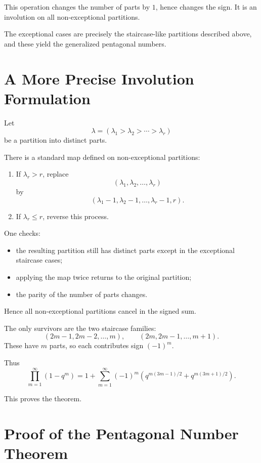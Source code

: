 \documentclass[11pt]{article}
\theoremstyle{definition}
\theoremstyle{remark}
\begin{document}
	This operation changes the number of parts by \(1\), hence changes the sign. It is an involution on all non-exceptional partitions.
	
	The exceptional cases are precisely the staircase-like partitions described above, and these yield the generalized pentagonal numbers.
	
	\section{A More Precise Involution Formulation}
	
	Let
	\[
	\lambda=(\lambda_1>\lambda_2>\cdots>\lambda_r)
	\]
	be a partition into distinct parts.
	
	There is a standard map defined on non-exceptional partitions:
	\begin{enumerate}[label=\arabic*.]
		\item If \(\lambda_r>r\), replace
		\[
		(\lambda_1,\lambda_2,\dots,\lambda_r)
		\]
		by
		\[
		(\lambda_1-1,\lambda_2-1,\dots,\lambda_r-1,r).
		\]
		\item If \(\lambda_r\le r\), reverse this process.
	\end{enumerate}
	
	One checks:
	\begin{itemize}
		\item the resulting partition still has distinct parts except in the exceptional staircase cases;
		\item applying the map twice returns to the original partition;
		\item the parity of the number of parts changes.
	\end{itemize}
	
	Hence all non-exceptional partitions cancel in the signed sum.
	
	The only survivors are the two staircase families:
	\[
	(2m-1,2m-2,\dots,m),
	\qquad
	(2m,2m-1,\dots,m+1).
	\]
	These have \(m\) parts, so each contributes sign \((-1)^m\).
	
	Thus
	\[
	\prod_{m=1}^{\infty}(1-q^m)
	=
	1+\sum_{m=1}^{\infty}(-1)^m
	\left(q^{m(3m-1)/2}+q^{m(3m+1)/2}\right).
	\]
	
	This proves the theorem.
	
	\section{Proof of the Pentagonal Number Theorem}
	
\end{document}
